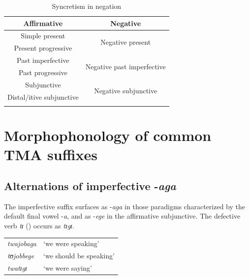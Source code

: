 \begin{table}[H]
\begin{center}
\begin{tabular}{cc}
\lsptoprule 
\footnotesize{Affirmative} & \footnotesize{Negative}\\ 
\midrule 
Simple present & \multirow{2}{*}{Negative present}\\
Present progressive & \\ \hline
Past imperfective & \multirow{2}{*}{Negative past imperfective}\\
Past progressive & \\ \hline
Subjunctive & \multirow{2}{*}{Negative subjunctive}\\
Distal/itive subjunctive& \\
\lspbottomrule
\end{tabular}
\caption{Syncretism in negation}
\label{tableSyncretismNegation}  
\end{center}
\end{table}

\newpage 
\section{Morphophonology of common TMA suffixes}
\subsection{Alternations of imperfective -\textit{aga}}\label{AlternationsIPFVaga} 
The imperfective suffix surfaces as -\textit{aga} in those paradigms characterized by the default final vowel -\textit{a}, and as -\textit{ege} in the affirmative subjunctive. The defective verb \textit{tɪ} () occurs as \textit{tɪgɪ}.
\begin{exe}
\ex
\begin{tabular}[t]{ll}
\textit{twajobaga}&`we were speaking'
\\\textit{tʊjobbege}&\lq we should be speaking'
\\\textit{twatɪgɪ}&`we were saying'
\end{tabular}
\end{exe}

